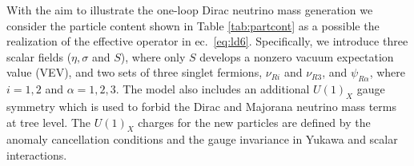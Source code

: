 \documentclass[12pt]{article}
\begin{document}
With the aim to illustrate the one-loop Dirac neutrino mass generation
we consider the particle content shown in Table \ref{tab:partcont} as
a possible the realization of the effective operator in
ec.~\eqref{eq:ld6}. Specifically, we introduce three scalar fields
($\eta, \sigma$ and $S$), where only $S$ develops a nonzero vacuum
expectation value (VEV), and two sets of three singlet fermions,
$\nu_{Ri}$ and $\nu_{R3}$, and $\psi_{R\alpha}$, where $i=1,2$ and
$\alpha=1,2,3$.  The model also includes an additional $U(1)_X$ gauge
symmetry which is used to forbid the Dirac and Majorana neutrino mass
terms at tree level.
The $U(1)_X$ charges for the new particles are defined by the anomaly cancellation conditions and the gauge invariance in Yukawa and scalar interactions.
\end{document}
